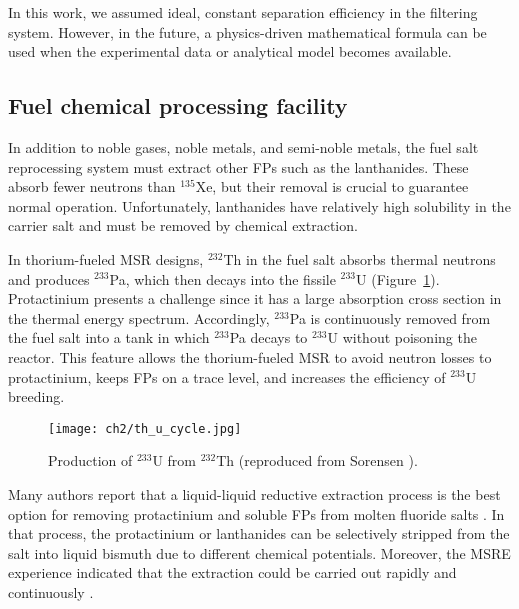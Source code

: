 In this work, we assumed ideal, constant separation efficiency in the 
filtering system. However, in the future, a physics-driven mathematical  
formula can be used when the experimental data or analytical model becomes 
available.


\subsection{Fuel chemical processing facility} \label{sec:chemical_processing}
In addition to noble gases, noble metals, and semi-noble metals, the fuel salt 
reprocessing system must extract other \glspl{FP} such as the lanthanides. 
These absorb fewer neutrons than $^{135}$Xe, but their removal is crucial to 
guarantee normal operation. Unfortunately, lanthanides have relatively high 
solubility in the carrier salt and must be removed by chemical extraction. 

In thorium-fueled \gls{MSR} designs, $^{232}$Th in the fuel salt absorbs 
thermal neutrons and produces $^{233}$Pa, which then decays into the fissile 
$^{233}$U (Figure~\ref{fig:th_u_reaction}). Protactinium presents a challenge  
since it has a large absorption cross section in the thermal energy spectrum. 
Accordingly, $^{233}$Pa is continuously removed from the fuel salt into a tank 
in which $^{233}$Pa decays to $^{233}$U without poisoning the reactor. This 
feature allows the thorium-fueled \gls{MSR} to avoid neutron losses to 
protactinium, keeps \glspl{FP} on a trace level, and increases the efficiency 
of $^{233}$U breeding. 
\begin{figure}[htp!] %
	\centering
	\texttt{[image: ch2/th\_u\_cycle.jpg]}
	\caption{Production of $^{233}$U from $^{232}$Th  (reproduced from 
	Sorensen \cite{sorensen_one-fluid_2006}).}
	\label{fig:th_u_reaction}
\end{figure}

Many authors report that a liquid-liquid reductive extraction process is the 
best option for removing protactinium and soluble \glspl{FP} from 
molten fluoride salts \cite{briggs_molten-salt_1969, delpech_molten_2010, 
doligez_coupled_2014}. In that process, the protactinium or lanthanides can be 
selectively stripped from the salt into liquid bismuth due to different  
chemical potentials. Moreover, the \gls{MSRE} experience indicated that the 
extraction could be carried out rapidly and continuously  
\cite{whatley_engineering_1970}.


